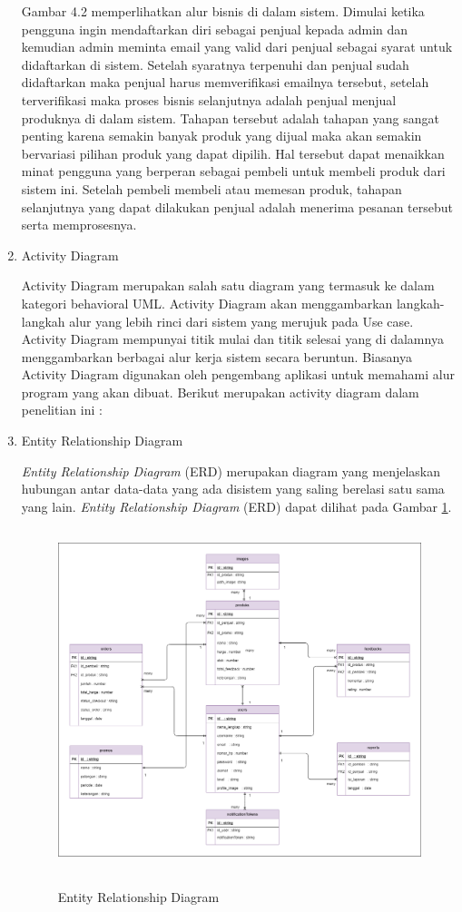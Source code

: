 \begin{enumerate}
		Gambar 4.2 memperlihatkan alur bisnis di dalam sistem. Dimulai ketika pengguna ingin mendaftarkan diri sebagai penjual kepada admin dan kemudian admin meminta email yang valid dari penjual sebagai syarat untuk didaftarkan di sistem. Setelah syaratnya terpenuhi dan penjual sudah didaftarkan maka penjual harus memverifikasi emailnya tersebut, setelah terverifikasi maka proses bisnis selanjutnya adalah penjual menjual produknya di dalam sistem.
		Tahapan tersebut adalah tahapan yang sangat penting karena semakin banyak produk yang dijual maka akan semakin bervariasi pilihan produk yang dapat dipilih. Hal tersebut dapat menaikkan minat pengguna yang berperan sebagai pembeli untuk membeli produk dari sistem ini. Setelah pembeli membeli atau memesan produk, tahapan selanjutnya yang dapat dilakukan penjual adalah menerima pesanan tersebut serta memprosesnya.
	
	\item Activity Diagram
		\par Activity Diagram merupakan salah satu diagram yang termasuk ke dalam kategori behavioral UML. Activity Diagram akan menggambarkan langkah-langkah alur yang lebih rinci dari sistem yang merujuk pada Use case. Activity Diagram mempunyai titik mulai dan titik selesai yang di dalamnya menggambarkan berbagai alur kerja sistem secara beruntun. Biasanya Activity
		Diagram digunakan oleh pengembang aplikasi untuk memahami alur program yang akan dibuat. Berikut merupakan activity diagram dalam penelitian ini :

	\item Entity Relationship Diagram
		\par \textit{Entity Relationship Diagram} (ERD) merupakan diagram yang menjelaskan hubungan antar data-data yang ada disistem yang saling berelasi satu sama yang lain.
		\textit{Entity Relationship Diagram} (ERD) dapat dilihat pada Gambar \ref{erd}.

		\begin{figure}[H]
			\centering
			{\includegraphics [width = 14cm, height= 10cm]{gambar/erd}}
			\caption{Entity Relationship Diagram}
			\label{erd}
		\end{figure}


\end{enumerate}
